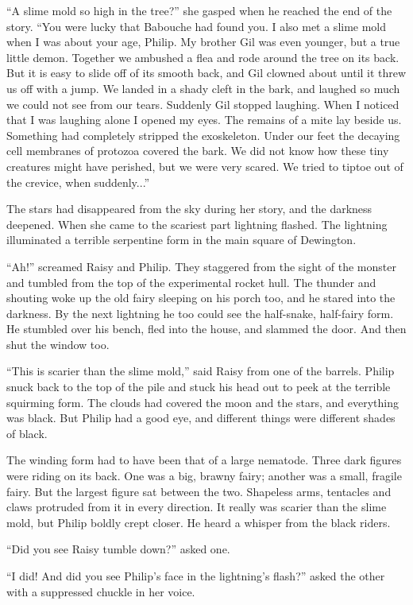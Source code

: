 \documentclass[10pt, draft]{memoir}
\begin{document}
``A slime mold so high in the tree?'' she gasped when he reached the end of the story. ``You were lucky that Babouche had found you. I also met a slime mold when I was about your age, Philip. My brother Gil was even younger, but a true little demon. Together we ambushed a flea and rode around the tree on its back. But it is easy to slide off of its smooth back, and Gil clowned about until it threw us off with a jump. We landed in a shady cleft in the bark, and laughed so much we could not see from our tears. Suddenly Gil stopped laughing. When I noticed that I was laughing alone I opened my eyes. The remains of a mite lay beside us. Something had completely stripped the exoskeleton. Under our feet the decaying cell membranes of protozoa covered the bark. We did not know how these tiny creatures might have perished, but we were very scared. We tried to tiptoe out of the crevice, when suddenly...''

The stars had disappeared from the sky during her story, and the darkness deepened. When she came to the scariest part lightning flashed. The lightning illuminated a terrible serpentine form in the main square of Dewington.

``Ah!'' screamed Raisy and Philip. They staggered from the sight of the monster and tumbled from the top of the experimental rocket hull. The thunder and shouting woke up the old fairy sleeping on his porch too, and he stared into the darkness. By the next lightning he too could see the half-snake, half-fairy form. He stumbled over his bench, fled into the house, and slammed the door. And then shut the window too.

``This is scarier than the slime mold,'' said Raisy from one of the barrels. Philip snuck back to the top of the pile and stuck his head out to peek at the terrible squirming form. The clouds had covered the moon and the stars, and everything was black. But Philip had a good eye, and different things were different shades of black.

The winding form had to have been that of a large nematode. Three dark figures were riding on its back. One was a big, brawny fairy; another was a small, fragile fairy. But the largest figure sat between the two. Shapeless arms, tentacles and claws protruded from it in every direction. It really was scarier than the slime mold, but Philip boldly crept closer. He heard a whisper from the black riders.

``Did you see Raisy tumble down?'' asked one.

``I did! And did you see Philip's face in the lightning's flash?'' asked the other with a suppressed chuckle in her voice.
\end{document}
